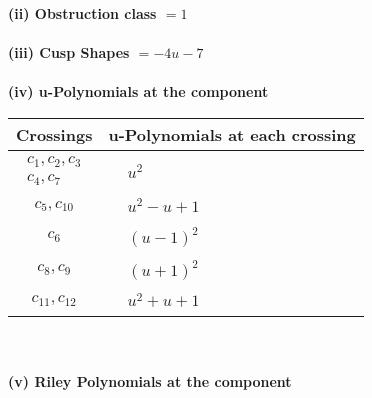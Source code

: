 \documentclass[1p]{elsarticle_modified}
\theoremstyle{definition}
\begin{document}
\flushleft \textbf{(ii) Obstruction class $= 1$}\\~\\
\flushleft \textbf{(iii) Cusp Shapes $= -4 u-7$}\\~\\
\newpage\renewcommand{\arraystretch}{1}
\flushleft \textbf{(iv) u-Polynomials at the component}\newline \\
\begin{tabular}{m{50pt}|m{274pt}}
Crossings & \hspace{64pt}u-Polynomials at each crossing \\
\hline $$\begin{aligned}c_{1},c_{2},c_{3}\\c_{4},c_{7}\end{aligned}$$&$\begin{aligned}
&u^2
\end{aligned}$\\
\hline $$\begin{aligned}c_{5},c_{10}\end{aligned}$$&$\begin{aligned}
&u^2- u+1
\end{aligned}$\\
\hline $$\begin{aligned}c_{6}\end{aligned}$$&$\begin{aligned}
&(u-1)^2
\end{aligned}$\\
\hline $$\begin{aligned}c_{8},c_{9}\end{aligned}$$&$\begin{aligned}
&(u+1)^2
\end{aligned}$\\
\hline $$\begin{aligned}c_{11},c_{12}\end{aligned}$$&$\begin{aligned}
&u^2+u+1
\end{aligned}$\\
\hline
\end{tabular}\\~\\
\newpage\renewcommand{\arraystretch}{1}
\flushleft \textbf{(v) Riley Polynomials at the component}\newline \\
\end{document}
